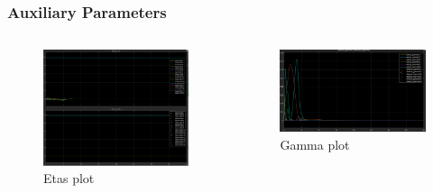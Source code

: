 \documentclass{beamer}
\begin{document}
\begin{frame}
    \frametitle{Auxiliary Parameters}

    \begin{columns}

        \begin{figure}[h]
            \centering
            \includegraphics[width=1\textwidth]{Etas.png}
            \caption{Etas plot}
            \label{fig:etas}
        \end{figure}

        \begin{figure}[h]
            \centering
            \includegraphics[width=1\textwidth]{Gamma.png}
            \caption{Gamma plot}
            \label{fig:gamma}
        \end{figure}
    \end{columns}
\end{frame}


\end{document}
